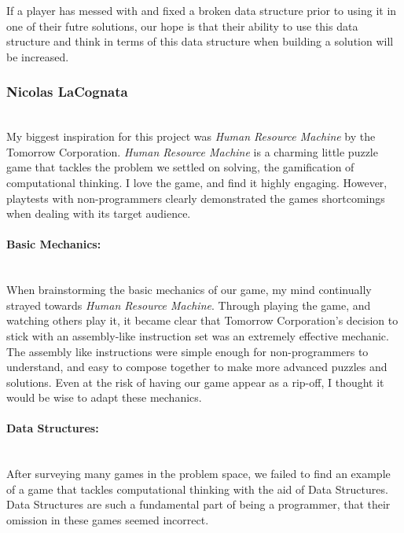 If a player has messed with and fixed a broken data structure prior to using it in one of
their futre solutions, our hope is that their ability to use this data structure and think in
terms of this data structure when building a solution will be increased.\\

\subsubsection{Nicolas LaCognata}\mbox{} \\
My biggest inspiration for this project was \textit{Human Resource Machine} by the Tomorrow Corporation.
\textit{Human Resource Machine} is a charming little puzzle game that tackles the problem we settled on solving,
the gamification of computational thinking. I love the game, and find it highly engaging. However, playtests
with non-programmers clearly demonstrated the games shortcomings when dealing with its target audience.

\paragraph{Basic Mechanics:}\mbox{} \\
When brainstorming the basic mechanics of our game, my mind continually strayed towards \textit{Human Resource Machine}.
Through playing the game, and watching others play it, it became clear that Tomorrow Corporation's decision to stick with
an assembly-like instruction set was an extremely effective mechanic.\\

The assembly like instructions were simple enough for non-programmers to understand, and easy to compose together to make more
advanced puzzles and solutions. Even at the risk of having our game appear as a rip-off, I thought it would be wise to adapt
these mechanics.

\paragraph{Data Structures:}\mbox{} \\
After surveying many games in the problem space, we failed to find an example of a game that tackles computational thinking
with the aid of Data Structures. Data Structures are such a fundamental part of being a programmer, that their omission in these
games seemed incorrect.

